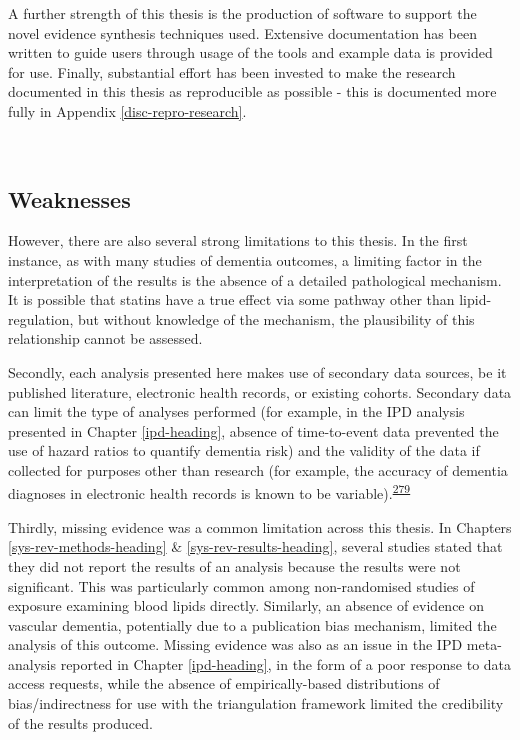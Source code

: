 \documentclass[a4paper, twoside]{templates/ociamthesis}
\begin{document}
A further strength of this thesis is the production of software to support the novel evidence synthesis techniques used. Extensive documentation has been written to guide users through usage of the tools and example data is provided for use. Finally, substantial effort has been invested to make the research documented in this thesis as reproducible as possible - this is documented more fully in Appendix \ref{disc-repro-research}.

~

\hypertarget{weaknesses}{%
\subsection{Weaknesses}\label{weaknesses}}

However, there are also several strong limitations to this thesis. In the first instance, as with many studies of dementia outcomes, a limiting factor in the interpretation of the results is the absence of a detailed pathological mechanism. It is possible that statins have a true effect via some pathway other than lipid-regulation, but without knowledge of the mechanism, the plausibility of this relationship cannot be assessed.

Secondly, each analysis presented here makes use of secondary data sources, be it published literature, electronic health records, or existing cohorts. Secondary data can limit the type of analyses performed (for example, in the IPD analysis presented in Chapter \ref{ipd-heading}, absence of time-to-event data prevented the use of hazard ratios to quantify dementia risk) and the validity of the data if collected for purposes other than research (for example, the accuracy of dementia diagnoses in electronic health records is known to be variable).\textsuperscript{\protect\hyperlink{ref-wilkinson2018}{279}}

Thirdly, missing evidence was a common limitation across this thesis. In Chapters \ref{sys-rev-methods-heading} \& \ref{sys-rev-results-heading}, several studies stated that they did not report the results of an analysis because the results were not significant. This was particularly common among non-randomised studies of exposure examining blood lipids directly. Similarly, an absence of evidence on vascular dementia, potentially due to a publication bias mechanism, limited the analysis of this outcome. Missing evidence was also as an issue in the IPD meta-analysis reported in Chapter \ref{ipd-heading}, in the form of a poor response to data access requests, while the absence of empirically-based distributions of bias/indirectness for use with the triangulation framework limited the credibility of the results produced.
\end{document}
